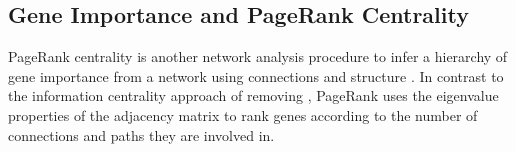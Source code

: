 \begin{table*}[!htb]
\caption{\acrshort{ANOVA} for synthetic lethality and information centrality}
\label{tab:SL_Pathway_GPCR_InfoCent}
\noindent{}
\end{table*} \filbreak

\FloatBarrier

\subsection{Gene Importance and PageRank Centrality}  \label{chapt4:Network_PageRank}

\FloatBarrier

\gls{PageRank centrality} is another network analysis procedure to infer a hierarchy of gene importance from a network using connections and structure \citep{Brin1998}. In contrast to the \gls{information centrality} approach of removing , PageRank uses the eigenvalue properties of the adjacency matrix to rank genes according to the number of connections and paths they are involved in. 

